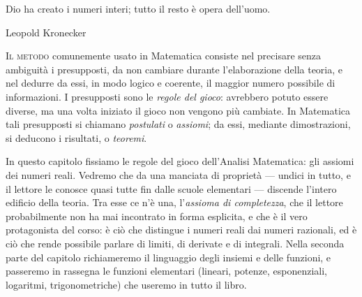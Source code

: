 
\epigraph{Dio ha creato i numeri interi; tutto il resto è opera dell'uomo.}{Leopold Kronecker}

\lettrine[lines=3, findent=2pt, nindent=0pt]{I}{l metodo} comunemente usato in
Matematica consiste nel precisare senza ambiguità i presupposti, da non cambiare durante
l'elaborazione della teoria, e nel dedurre da essi, in modo logico e coerente, il
maggior numero possibile di informazioni. I presupposti sono le \emph{regole del gioco}:
avrebbero potuto essere diverse, ma una volta iniziato il gioco non vengono più cambiate.
In Matematica tali presupposti si chiamano \emph{postulati} o \emph{assiomi}; da essi,
mediante dimostrazioni, si deducono i risultati, o \emph{teoremi}.

In questo capitolo fissiamo le regole del gioco dell'Analisi Matematica: gli assiomi dei
numeri reali. Vedremo che da una manciata di proprietà --- undici in tutto, e il lettore
le conosce quasi tutte fin dalle scuole elementari --- discende l'intero edificio della
teoria. Tra esse ce n'è una, l'\emph{assioma di completezza}, che il lettore
probabilmente non ha mai incontrato in forma esplicita, e che è il vero protagonista del
corso: è ciò che distingue i numeri reali dai numeri razionali, ed è ciò che rende
possibile parlare di limiti, di derivate e di integrali. Nella seconda parte del
capitolo richiameremo il linguaggio degli insiemi e delle funzioni, e passeremo in
rassegna le funzioni elementari (lineari, potenze, esponenziali, logaritmi,
trigonometriche) che useremo in tutto il libro.

